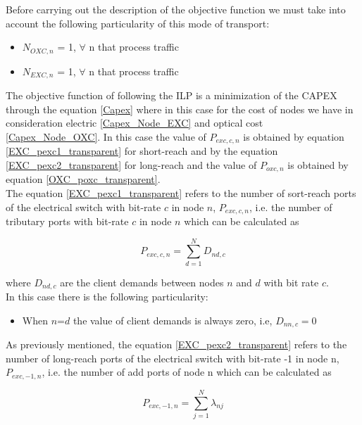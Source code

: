 Before carrying out the description of the objective function we must take into account the following particularity of this mode of transport:
\begin{itemize}
  \item $N_{OXC,n}$ = 1, \quad $\forall$ n that process traffic
  \item $N_{EXC,n}$ = 1, \quad $\forall$ n that process traffic
\end{itemize}

\vspace{7pt}
The objective function of following the ILP is a minimization of the CAPEX through the equation \ref{Capex} where in this case for the cost of nodes we have in consideration electric \ref{Capex_Node_EXC} and optical cost \ref{Capex_Node_OXC}. In this case the value of $P_{exc,c,n}$ is obtained by equation \ref{EXC_pexc1_transparent} for short-reach and by the equation \ref{EXC_pexc2_transparent} for long-reach and the value of $P_{oxc,n}$ is obtained by equation \ref{OXC_poxc_transparent}.\\

The equation \ref{EXC_pexc1_transparent} refers to the number of sort-reach ports of the electrical switch with bit-rate $c$ in node $n$, $P_{exc,c,n}$, i.e. the number of tributary ports with bit-rate $c$ in node $n$ which can be calculated as

\begin{equation}
P_{exc,c,n} = \sum_{d=1}^{N} D_{nd,c}
\label{EXC_pexc1_transparent}
\end{equation}

\vspace{11pt}
\noindent
where $D_{nd,c}$ are the client demands between nodes $n$ and $d$ with bit rate $c$.\\

In this case there is the following particularity:
\begin{itemize}
  \item When $n$=$d$ the value of client demands is always zero, i.e, $D_{nn,c}=0$
\end{itemize}

\vspace{11pt}
As previously mentioned, the equation \ref{EXC_pexc2_transparent} refers to the number of long-reach ports of the electrical switch with bit-rate -1 in node n, $P_{exc,-1,n}$, i.e. the number of add ports of node n which can be calculated as

\begin{equation}
P_{exc,-1,n} = \sum_{j=1}^{N} \lambda_{nj}
\label{EXC_pexc2_transparent}
\end{equation}

